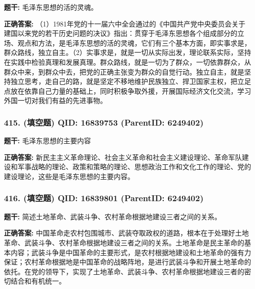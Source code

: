 \documentclass[12pt,UTF8]{ctexart}
\begin{document}
\textbf{题干:}
毛泽东思想的活的灵魂。



\textbf{正确答案:}
（1）1981年党的十一届六中全会通过的《中国共产党中央委员会关于建国以来党的若干历史问题的决议》指出：贯穿于毛泽东思想各个组成部分的立场、观点和方法，是毛泽东思想的活的灵魂，它们有三个基本方面，即实事求是，群众路线，独立自主。（2）实事求是，就是一切从实际出发，理论联系实际，坚持在实践中检验真理和发展真理。群众路线，就是一切为了群众，一切依靠群众，从群众中来，到群众中去，把党的正确主张变为群众的自觉行动。独立自主，就是坚持独立思考，走自己的路，就是坚定不移地维护民族独立、捍卫国家主权，把立足点放在依靠自己力量的基础上，同时积极争取外援，开展国际经济文化交流，学习外国一切对我们有益的先进事物。

\vspace{0.3em}\hrulefill\vspace{0.7em}

\subsubsection*{415. (填空题) \small QID: 16839753 (ParentID: 6249402)}

\textbf{题干:}
毛泽东思想的主要内容



\textbf{正确答案:}
新民主主义革命理论、社会主义革命和社会主义建设理论、革命军队建设和军事战略的理论、政策和策略的理论、思想政治工作和文化工作的理论、党的建设理论，这些是毛泽东思想的主要内容。

\vspace{0.3em}\hrulefill\vspace{0.7em}

\subsubsection*{416. (填空题) \small QID: 16839801 (ParentID: 6249402)}

\textbf{题干:}
简述土地革命、武装斗争、农村革命根据地建设三者之间的关系。



\textbf{正确答案:}
中国革命走农村包围城市、武装夺取政权的道路，根本在于处理好土地革命、武装斗争、农村革命根据地建设三者之间的关系。土地革命是民主革命的基本内容；武装斗争是中国革命的主要形式，是农村根据地建设和土地革命的强有力保证；农村革命根据地是中国革命的战略阵地，是进行武装斗争和开展土地革命的依托。在党的领导下，实现了土地革命、武装斗争、农村革命根据地建设三者的密切结合和有机统一。

\vspace{0.3em}\hrulefill\vspace{0.7em}
\end{document}
